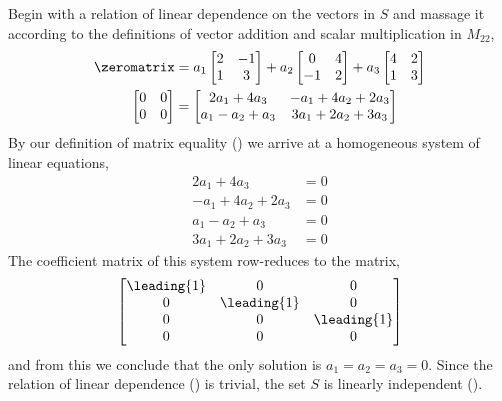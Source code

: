 Begin with a relation of linear dependence on the vectors in $S$ and massage it according to the definitions of vector addition and scalar multiplication in $M_{22}$,
%
\begin{align*}
\zeromatrix&=
a_1
\begin{bmatrix}
2&-1\\1&3
\end{bmatrix}+
a_2
\begin{bmatrix}
0&4\\-1&2
\end{bmatrix}+
a_3
\begin{bmatrix}
4&2\\1&3
\end{bmatrix}\\
%
\begin{bmatrix}
0&0\\0&0
\end{bmatrix}
&=
\begin{bmatrix}
2a_1+4a_3&
-a_1+4a_2+2a_3\\
a_1-a_2+a_3&
3a_1+2a_2+3a_3
\end{bmatrix}
%
\end{align*}
%
By our definition of matrix equality () we arrive at a homogeneous system of linear equations,
%
\begin{align*}
2a_1+4a_3&=0\\
-a_1+4a_2+2a_3&=0\\
a_1-a_2+a_3&=0\\
3a_1+2a_2+3a_3&=0
\end{align*}
%
The coefficient matrix of this system row-reduces to the matrix,
%
\begin{equation*}
\begin{bmatrix}
\leading{1} & 0 & 0\\
0 & \leading{1} & 0\\
0 & 0 & \leading{1}\\
0 & 0 & 0
\end{bmatrix}
\end{equation*}
%
and from this we conclude that the only solution is $a_1=a_2=a_3=0$.  Since the relation of linear dependence () is trivial, the set $S$ is linearly independent ().